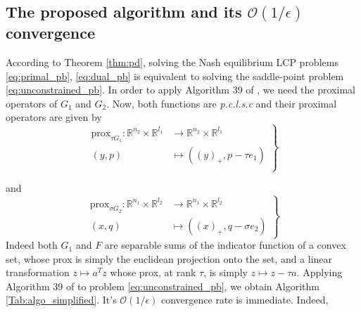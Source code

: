 \documentclass[12pt]{article}
\begin{document}
\subsection{The proposed algorithm and its $\mathcal{O}(1/\epsilon)$ convergence}
According to Theorem \ref{thm:pd}, solving the Nash equilibrium LCP problems \eqref{eq:primal_pb}, \eqref{eq:dual_pb} is equivalent to solving the saddle-point problem \eqref{eq:unconstrained_pb}.
In order to apply Algorithm 39 of \cite{chambolle2010}, we need the proximal operators of
$G_1$ and $G_2$. Now, both functions are \textit{p.c.l.s.c} and their proximal operators are given by
  \begin{equation}
    \left .
    \begin{split}
      \text{prox}_{\tau G_1} : \mathbb{R}^{n_2} \times \mathbb{R}^{l_1} &\rightarrow \mathbb{R}^{n_2} \times \mathbb{R}^{l_1}\\
      (y, p) &\mapsto ((y)_+, p - \tau e_1)\\
    \end{split}
    \right\}
  \end{equation}

  and
  \begin{equation}
    \left .
    \begin{split}
      \text{prox}_{\sigma G_2}: \mathbb{R}^{n_1} \times \mathbb{R}^{l_2} &\rightarrow \mathbb{R}^{n_1} \times \mathbb{R}^{l_2}\\
      (x, q) &\mapsto ((x)_+, q - \sigma e_2)
    \end{split}
    \right\}
  \end{equation}
Indeed both $G_1$ and $F$ are separable sums of the indicator function of a convex set, whose prox is simply the euclidean projection onto the set,  and a linear transformation $z \mapsto a^Tz$ whose prox, at rank $\tau$, is simply $z \mapsto z - \tau a$.
Applying Algorithm 39 of \cite{chambolle2010} to problem \eqref{eq:unconstrained_pb}, we obtain Algorithm \ref{Tab:algo_simplified}. It's $\mathcal{O}(1/\epsilon)$ convergence rate is immediate. Indeed,
\end{document}
